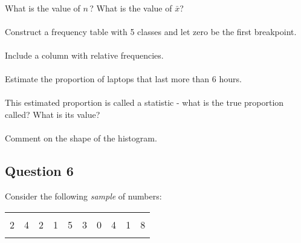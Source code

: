 \documentclass[12pt]{article}
\begin{document}
\hspace{-1.8cm}{\bf a.}\vspace{-0.5cm}\\
What is the value of $n$\,? What is the value of $\bar x$?\\[-0.3cm]

\hspace{-1.8cm}{\bf b.}\vspace{-0.5cm}\\
Construct a frequency table with 5 classes and let zero be the first breakpoint.\\[-0.3cm]

\hspace{-1.8cm}{\bf c.}\vspace{-0.5cm}\\
Include a column with relative frequencies.\\[-0.3cm]

\hspace{-1.8cm}{\bf d.}\vspace{-0.5cm}\\
Estimate the proportion of laptops that last more than 6 hours.\\[-0.3cm]

\hspace{-1.8cm}{\bf e.}\vspace{-0.5cm}\\
This estimated proportion is called a statistic - what is the true proportion called? What is its value?\\[-0.3cm]

\hspace{-1.8cm}{\bf f.}\vspace{-0.5cm}\\
Comment on the shape of the histogram.\\[-0.3cm]



\subsection*{Question 6}
Consider the following \emph{sample} of numbers:
\begin{center}
\begin{tabular}{|cccccccccc|}
\hline
&&&&&&&&&\\[-0.4cm]
2 & 4 & 2 & 1 & 5 & 3 & 0 & 4 & 1 & 8 \\
\hline
\multicolumn{10}{c}{}\\
\end{tabular}
\end{center}
\end{document}
